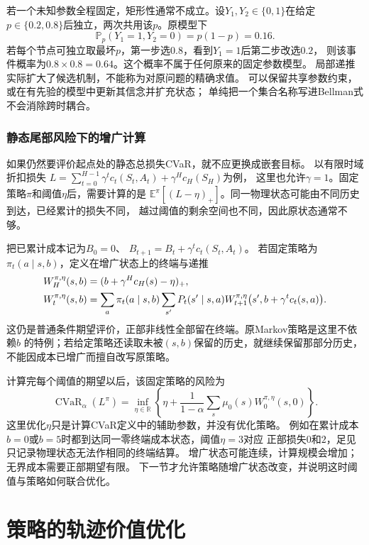 若一个未知参数全程固定，矩形性通常不成立。设$Y_1,Y_2\in\{0,1\}$在给定
$p\in\{0.2,0.8\}$后独立，两次共用该$p$。原模型下
\[
  \mathbb P_p(Y_1=1,Y_2=0)=p(1-p)=0.16.
\]
若每个节点可独立取最坏$p$，第一步选$0.8$，看到$Y_1=1$后第二步改选$0.2$，
则该事件概率为$0.8\times0.8=0.64$。这个概率不属于任何原来的固定参数模型。
局部递推实际扩大了候选机制，不能称为对原问题的精确求值。
可以保留共享参数约束，或在有先验的模型中更新其信念并扩充状态；
单纯把一个集合名称写进Bellman式不会消除跨时耦合。

\subsubsection{静态尾部风险下的增广计算}
\label{sec:policy-static-cvar-evaluation}

如果仍然要评价起点处的静态总损失CVaR，就不应更换成嵌套目标。
以有限时域折扣损失
$L=\sum_{t=0}^{H-1}\gamma^tc_t(S_t,A_t)+\gamma^Hc_H(S_H)$为例，
这里也允许$\gamma=1$。固定策略$\pi$和阈值$\eta$后，需要计算的是
$\mathbb E^\pi[(L-\eta)_+]$。同一物理状态可能由不同历史到达，已经累计的损失不同，
越过阈值的剩余空间也不同，因此原状态通常不够。

把已累计成本记为$B_0=0$、
$B_{t+1}=B_t+\gamma^tc_t(S_t,A_t)$。
若固定策略为$\pi_t(a\mid s,b)$，定义在增广状态上的终端与递推
\begin{align}
  W_H^{\pi,\eta}(s,b)&=(b+\gamma^Hc_H(s)-\eta)_+,\notag\\
  W_t^{\pi,\eta}(s,b)
  &=\sum_a\pi_t(a\mid s,b)\sum_{s'}P_t(s'\mid s,a)
    W_{t+1}^{\pi,\eta}\bigl(s',b+\gamma^tc_t(s,a)\bigr).
  \label{eq:policy-static-cvar-augmented-evaluation}
\end{align}
这仍是普通条件期望评价，正部非线性全部留在终端。原Markov策略是这里不依赖$b$
的特例；若给定策略还读取未被$(s,b)$保留的历史，就继续保留那部分历史，
不能因成本已增广而擅自改写原策略。

计算完每个阈值的期望以后，该固定策略的风险为
\[
  \operatorname{CVaR}_\alpha(L^\pi)
  =\inf_{\eta\in\mathbb R}
    \left\{\eta+\frac{1}{1-\alpha}
      \sum_s\mu_0(s)W_0^{\pi,\eta}(s,0)\right\}.
\]
这里优化$\eta$只是计算CVaR定义中的辅助参数，并没有优化策略。
例如在累计成本$b=0$或$b=5$时都到达同一零终端成本状态，阈值$\eta=3$对应
正部损失$0$和$2$，足见只记录物理状态无法作相同的终端结算。
增广状态可能连续，计算规模会增加；无界成本需要正部期望有限。
下一节才允许策略随增广状态改变，并说明这时阈值与策略如何联合优化。

\section{策略的轨迹价值优化}
\label{sec:policy-value-optimization}

